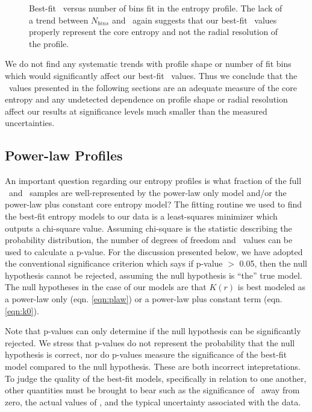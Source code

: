 \begin{figure}[!t]
\begin{minipage}[t]{0.5\linewidth}
    \caption[Best-fit \kna\ versus number of fit bins.]{Best-fit
      \kna\ versus number of bins fit in the entropy profile. The lack
      of a trend between $N_{bins}$ and \kna\ again suggests that our
      best-fit \kna\ values properly represent the core entropy and
      not the radial resolution of the profile.}
    \label{fig:nbins}
  \end{minipage}
\end{figure}

We do not find any systematic trends with profile shape or number of
fit bins which would significantly affect our best-fit \kna\
values. Thus we conclude that the \kna\ values presented in the
following sections are an adequate measure of the core entropy and any
undetected dependence on profile shape or radial resolution affect our
results at significance levels much smaller than the measured
uncertainties.

\subsection{Power-law Profiles}
\label{sec:entsuppquality}

An important question regarding our entropy profiles is what fraction
of the full \accept\ and \hifl\ samples are well-represented by the
power-law only model and/or the power-law plus constant core entropy
model? The fitting routine we used to find the best-fit entropy models
to our data is a least-squares minimizer which outputs a chi-square
value. Assuming chi-square is the statistic describing the probability
distribution, the number of degrees of freedom and \chisq\ values can
be used to calculate a p-value. For the discussion presented below, we
have adopted the conventional significance criterion which says if
p-value $>$ 0.05, then the null hypothesis cannot be rejected, assuming
the null hypothesis is ``the'' true model. The null hypotheses in the
case of our models are that $K(r)$ is best modeled as a power-law only
(eqn. \ref{eqn:plaw}) or a power-law plus constant term
(eqn. \ref{eqn:k0}).

Note that p-values can only determine if the null hypothesis can be
significantly rejected. We stress that p-values do not represent the
probability that the null hypothesis is correct, nor do p-values
measure the significance of the best-fit model compared to the null
hypothesis. These are both incorrect intepretations. To judge the
quality of the best-fit models, specifically in relation to one
another, other quantities must be brought to bear such as the
significance of \kna\ away from zero, the actual values of \chisq, and
the typical uncertainty associated with the data.

